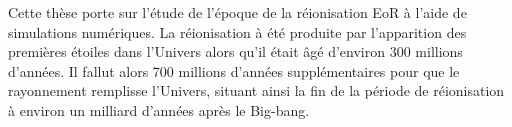 %
%
Cette thèse porte sur l'étude de l'époque de la réionisation \ac{EoR} à l'aide de simulations numériques.
La réionisation à été produite par l'apparition des premières étoiles dans l'Univers alors qu'il était âgé d'environ 300 millions d'années. 
Il fallut alors 700 millions d'années supplémentaires pour que le rayonnement remplisse l'Univers, situant ainsi la fin de la période de réionisation à environ un milliard d'années après le Big-bang.



